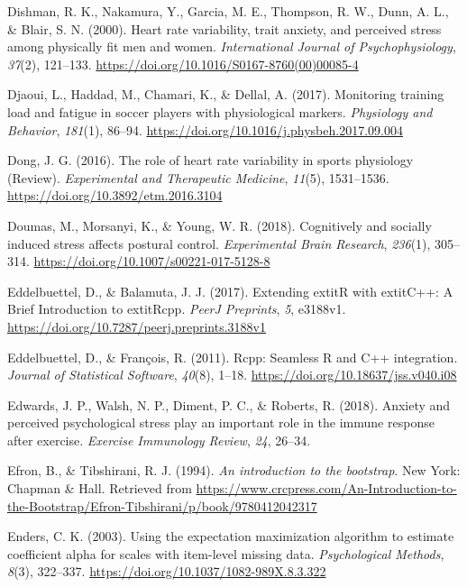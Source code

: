 \documentclass[
  english,
  man,floatsintext]{apa6}
\begin{document}
\leavevmode\hypertarget{ref-Dishman2000}{}%
Dishman, R. K., Nakamura, Y., Garcia, M. E., Thompson, R. W., Dunn, A. L., \& Blair, S. N. (2000). Heart rate variability, trait anxiety, and perceived stress among physically fit men and women. \emph{International Journal of Psychophysiology}, \emph{37}(2), 121--133. \url{https://doi.org/10.1016/S0167-8760(00)00085-4}

\leavevmode\hypertarget{ref-Djaoui2017}{}%
Djaoui, L., Haddad, M., Chamari, K., \& Dellal, A. (2017). Monitoring training load and fatigue in soccer players with physiological markers. \emph{Physiology and Behavior}, \emph{181}(1), 86--94. \url{https://doi.org/10.1016/j.physbeh.2017.09.004}

\leavevmode\hypertarget{ref-Dong2016a}{}%
Dong, J. G. (2016). The role of heart rate variability in sports physiology (Review). \emph{Experimental and Therapeutic Medicine}, \emph{11}(5), 1531--1536. \url{https://doi.org/10.3892/etm.2016.3104}

\leavevmode\hypertarget{ref-Doumas2018}{}%
Doumas, M., Morsanyi, K., \& Young, W. R. (2018). Cognitively and socially induced stress affects postural control. \emph{Experimental Brain Research}, \emph{236}(1), 305--314. \url{https://doi.org/10.1007/s00221-017-5128-8}

\leavevmode\hypertarget{ref-R-Rcpp_b}{}%
Eddelbuettel, D., \& Balamuta, J. J. (2017). Extending extitR with extitC++: A Brief Introduction to extitRcpp. \emph{PeerJ Preprints}, \emph{5}, e3188v1. \url{https://doi.org/10.7287/peerj.preprints.3188v1}

\leavevmode\hypertarget{ref-R-Rcpp_a}{}%
Eddelbuettel, D., \& François, R. (2011). Rcpp: Seamless R and C++ integration. \emph{Journal of Statistical Software}, \emph{40}(8), 1--18. \url{https://doi.org/10.18637/jss.v040.i08}

\leavevmode\hypertarget{ref-Edwards2018}{}%
Edwards, J. P., Walsh, N. P., Diment, P. C., \& Roberts, R. (2018). Anxiety and perceived psychological stress play an important role in the immune response after exercise. \emph{Exercise Immunology Review}, \emph{24}, 26--34.

\leavevmode\hypertarget{ref-Efron1993}{}%
Efron, B., \& Tibshirani, R. J. (1994). \emph{An introduction to the bootstrap}. New York: Chapman \& Hall. Retrieved from \url{https://www.crcpress.com/An-Introduction-to-the-Bootstrap/Efron-Tibshirani/p/book/9780412042317}

\leavevmode\hypertarget{ref-Enders2003}{}%
Enders, C. K. (2003). Using the expectation maximization algorithm to estimate coefficient alpha for scales with item-level missing data. \emph{Psychological Methods}, \emph{8}(3), 322--337. \url{https://doi.org/10.1037/1082-989X.8.3.322}
\end{document}
